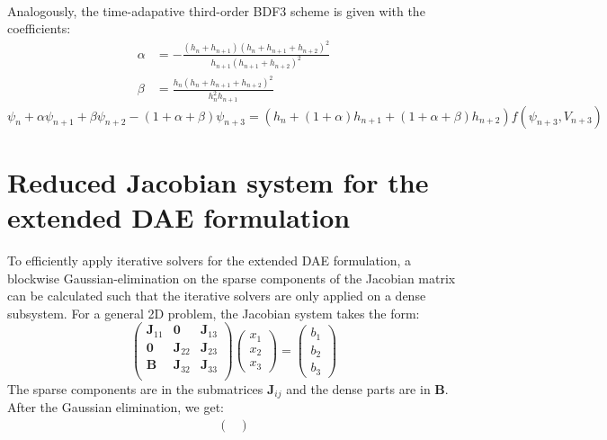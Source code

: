 \documentclass{report}
\begin{document}
\begin{appendices}
\begin{align}
	\end{align}
	Analogously, the time-adapative third-order BDF3 scheme is given with the coefficients: 
	\begin{align}
	\alpha &= -\frac{\left(h_n+h_{n+1}\right)\left(h_n+h_{n+1}+h_{n+2}\right)^2}
	{h_{n+1}\left(h_{n+1}+h_{n+2}\right)^2} \\
	\beta &= \frac{h_n\left(h_n+h_{n+1}+h_{n+2}\right)^2}
	{h_{n}^2h_{n+1}}
	\end{align}
	\begin{equation}
	\label{eq:BDF_coeffs_3rd_order}
	\psi_n + \alpha \psi_{n+1} + \beta \psi_{n+2} -(1+\alpha+\beta)\psi_{n+3} = \left(h_n + (1+\alpha)h_{n+1} + (1+\alpha+\beta)h_{n+2}\right)f(\psi_{n+3},V_{n+3})
	\end{equation}
	
	\chapter{Reduced Jacobian system for the extended DAE formulation}
	\label{apx:ReducedJacobianExtendedDAE}
	To efficiently apply iterative solvers for the extended DAE formulation, a blockwise Gaussian-elimination on the sparse components of the Jacobian matrix can be calculated such that the iterative solvers are only applied on a dense subsystem. For a general 2D problem, the Jacobian system takes the form: 
	\begin{equation}
		\begin{pmatrix}
			\mathbf{J}_{11} & \mathbf{0}      & \mathbf{J}_{13} \\
			\mathbf{0}        & \mathbf{J}_{22} & \mathbf{J}_{23}   \\
			\mathbf{B}      & \mathbf{J}_{32} & \mathbf{J}_{33}   \\
		\end{pmatrix}\begin{pmatrix}
		   				x_1 \\ x_2 \\ x_3 
					 \end{pmatrix} = \begin{pmatrix}
										 b_1 \\ b_2 \\ b_3 
									 \end{pmatrix}
 	\end{equation}
 	The sparse components are in the submatrices $\mathbf{J}_{ij}$ and the dense parts are in $\mathbf{B}$. After the Gaussian elimination, we get:
	\begin{align}
	\begin{pmatrix}

\end{pmatrix}
\end{align}
\end{appendices}
\end{document}
